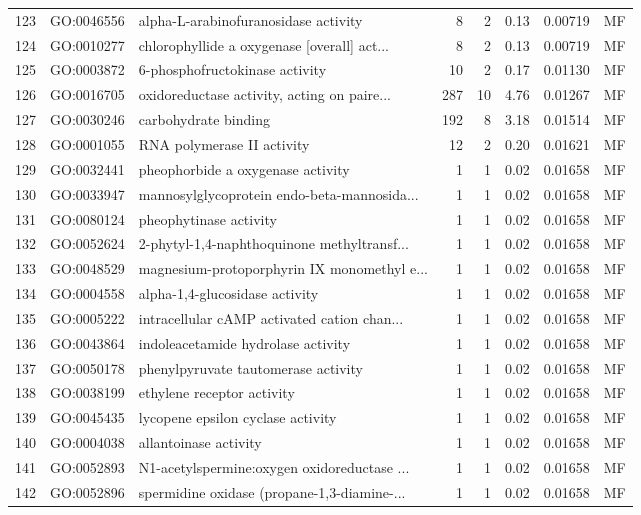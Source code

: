 \documentclass[12pt,oneside,a4paper]{article}
\begin{document}
\begin{longtable}{rllrrrll}
  123 & GO:0046556 & alpha-L-arabinofuranosidase activity &   8 &   2 & 0.13 & 0.00719 & MF \\ 
  124 & GO:0010277 & chlorophyllide a oxygenase [overall] act... &   8 &   2 & 0.13 & 0.00719 & MF \\ 
  125 & GO:0003872 & 6-phosphofructokinase activity &  10 &   2 & 0.17 & 0.01130 & MF \\ 
  126 & GO:0016705 & oxidoreductase activity, acting on paire... & 287 &  10 & 4.76 & 0.01267 & MF \\ 
  127 & GO:0030246 & carbohydrate binding & 192 &   8 & 3.18 & 0.01514 & MF \\ 
  128 & GO:0001055 & RNA polymerase II activity &  12 &   2 & 0.20 & 0.01621 & MF \\ 
  129 & GO:0032441 & pheophorbide a oxygenase activity &   1 &   1 & 0.02 & 0.01658 & MF \\ 
  130 & GO:0033947 & mannosylglycoprotein endo-beta-mannosida... &   1 &   1 & 0.02 & 0.01658 & MF \\ 
  131 & GO:0080124 & pheophytinase activity &   1 &   1 & 0.02 & 0.01658 & MF \\ 
  132 & GO:0052624 & 2-phytyl-1,4-naphthoquinone methyltransf... &   1 &   1 & 0.02 & 0.01658 & MF \\ 
  133 & GO:0048529 & magnesium-protoporphyrin IX monomethyl e... &   1 &   1 & 0.02 & 0.01658 & MF \\ 
  134 & GO:0004558 & alpha-1,4-glucosidase activity &   1 &   1 & 0.02 & 0.01658 & MF \\ 
  135 & GO:0005222 & intracellular cAMP activated cation chan... &   1 &   1 & 0.02 & 0.01658 & MF \\ 
  136 & GO:0043864 & indoleacetamide hydrolase activity &   1 &   1 & 0.02 & 0.01658 & MF \\ 
  137 & GO:0050178 & phenylpyruvate tautomerase activity &   1 &   1 & 0.02 & 0.01658 & MF \\ 
  138 & GO:0038199 & ethylene receptor activity &   1 &   1 & 0.02 & 0.01658 & MF \\ 
  139 & GO:0045435 & lycopene epsilon cyclase activity &   1 &   1 & 0.02 & 0.01658 & MF \\ 
  140 & GO:0004038 & allantoinase activity &   1 &   1 & 0.02 & 0.01658 & MF \\ 
  141 & GO:0052893 & N1-acetylspermine:oxygen oxidoreductase ... &   1 &   1 & 0.02 & 0.01658 & MF \\ 
  142 & GO:0052896 & spermidine oxidase (propane-1,3-diamine-... &   1 &   1 & 0.02 & 0.01658 & MF \\ 

\end{longtable}
\end{document}
